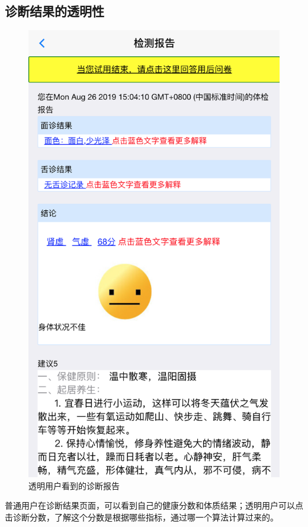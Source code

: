 \subsection{诊断结果的透明性}
\begin{figure}
    \centering
    \includegraphics{images/report3.png}
    \caption{透明用户看到的诊断报告}
    \label{fig:my_label}
\end{figure}
普通用户在诊断结果页面，可以看到自己的健康分数和体质结果；透明用户可以点击诊断分数，了解这个分数是根据哪些指标，通过哪一个算法计算过来的。

